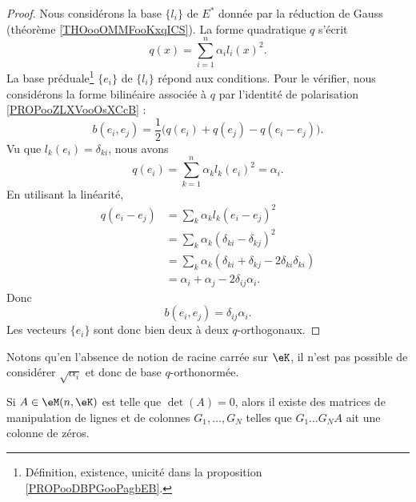 \begin{proof}
    Nous considérons la base \(  \{ l_i \}    \) de \( E^*\) donnée par la réduction de Gauss (théorème \ref{THOooOMMFooKxqICS}). La forme quadratique \( q\) s'écrit
    \begin{equation}
        q(x)=\sum_{i=1}^n\alpha_il_i(x)^2.
    \end{equation}
    La base préduale\footnote{Définition, existence, unicité dans la proposition \ref{PROPooDBPGooPagbEB}.} \( \{ e_i \}\) de \( \{ l_i \}\) répond aux conditions. Pour le vérifier, nous considérons la forme bilinéaire associée à \( q\) par l'identité de polarisation \ref{PROPooZLXVooOsXCcB} :
    \begin{equation}
        b(e_i,e_j)=\frac{ 1 }{2}\big( q(e_i)+q(e_j)-q(e_i-e_j) \big).
    \end{equation}
    Vu que \( l_k(e_i)=\delta_{ki}\), nous avons
    \begin{equation}
        q(e_i)=\sum_{k=1}^n\alpha_kl_k(e_i)^2=\alpha_i.
    \end{equation}
    En utilisant la linéarité,
    \begin{subequations}
        \begin{align}
            q(e_i-e_j)&=\sum_k\alpha_kl_k(e_i-e_j)^2\\
            &=\sum_k\alpha_k(\delta_{ki}-\delta_{kj})^2\\
            &=\sum_k\alpha_k(\delta_{ki}+\delta_{kj}-2\delta_{ki}\delta_{ki})\\
            &=\alpha_i+\alpha_j-2\delta_{ij}\alpha_i.
        \end{align}
    \end{subequations}
    Donc 
    \begin{equation}
        b(e_i,e_j)=\delta_{ij}\alpha_i.
    \end{equation}
    Les vecteurs \( \{ e_i \}\) sont donc bien deux à deux \( q\)-orthogonaux.
\end{proof}

Notons qu'en l'absence de notion de racine carrée sur \( \eK\), il n'est pas possible de considérer \( \sqrt{ \alpha_i }\) et donc de base \( q\)-orthonormée.


\begin{proposition} \label{PROPooPMYCooAAtHsB}
    Si \( A\in \eM(n,\eK)\) est telle que \( \det(A)=0\), alors il existe des matrices de manipulation de lignes et de colonnes \( G_1,\ldots, G_N\) telles que \( G_1\ldots G_NA\) ait une colonne de zéros.
\end{proposition}

